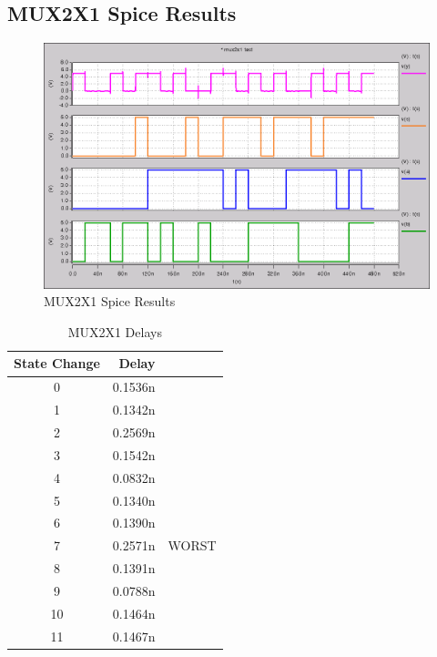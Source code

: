     \subsection{MUX2X1 Spice Results}
        
        \begin{figure}[H]
            \centering
            \includegraphics[width=0.75\linewidth]{../../spice/mux2x1.png}
            \caption{MUX2X1 Spice Results}
        \end{figure}
        \begin{table}[H]
            \centering
            \begin{tabular}{crc}
                \toprule
                \textbf{State Change} & \textbf{Delay} & \\
                \midrule
                0  & 0.1536n & \\
                1  & 0.1342n & \\
                2  & 0.2569n & \\
                3  & 0.1542n & \\
                4  & 0.0832n & \\
                5  & 0.1340n & \\
                6  & 0.1390n & \\
                7  & 0.2571n & WORST \\
                8  & 0.1391n & \\
                9  & 0.0788n & \\
                10 & 0.1464n & \\
                11 & 0.1467n & \\
                \bottomrule
            \end{tabular}
            \caption{MUX2X1 Delays}
        \end{table}

